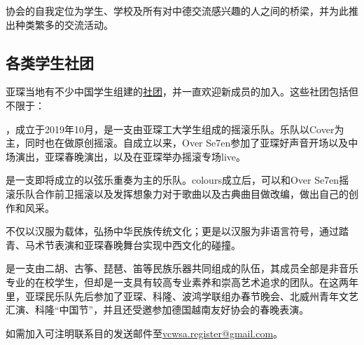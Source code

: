     协会的自我定位为学生、学校及所有对中德交流感兴趣的人之间的桥梁，并为此推出种类繁多的交流活动。

  \subsection{各类学生社团}\label{subsec:各类学生社团}

    亚琛当地有不少中国学生组建的\href{http://www.vcwsa.rwth-aachen.de/category/lives/社团风采/}{社团}，并一直欢迎新成员的加入。这些社团包括但不限于：

    ，成立于2019年10月，是一支由亚琛工大学生组成的摇滚乐队。乐队以Cover为主，同时也在做原创摇滚。自成立以来，Over Se7en参加了亚琛好声音开场以及中场演出，亚琛春晚演出，以及在亚琛举办摇滚专场live。

    是一支即将成立的以弦乐重奏为主的乐队。colours成立后，可以和Over Se7en摇滚乐队合作前卫摇滚以及发挥想象力对于歌曲以及古典曲目做改编，做出自己的创作和风采。

    不仅以汉服为载体，弘扬中华民族传统文化；更是以汉服为非语言符号，通过踏青、马术节表演和亚琛春晚舞台实现中西文化的碰撞。

    是一支由二胡、古筝、琵琶、笛等民族乐器共同组成的队伍，其成员全部是非音乐专业的在校学生，但却是一支具有较高专业素养和崇高艺术追求的团队。在这两年里，亚琛民乐队先后参加了亚琛、科隆、波鸿学联组办春节晚会、北威州青年文艺汇演、科隆``中国节''，并且还受邀参加德国越南友好协会的春晚表演。

    如需加入可注明联系目的发送邮件至\href{mailto:vcwsa.register@gmail.com}{vcwsa.register@gmail.com}。
